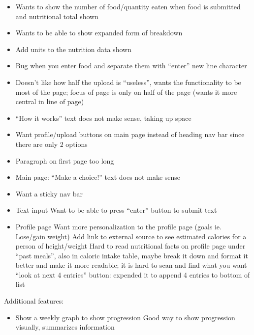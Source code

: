 \documentclass[12pt, titlepage]{article}
\begin{document}
	\begin{itemize}
		\item Wants to show the number of food/quantity eaten when food is submitted and nutritional total
		shown
		\item Wants to be able to show expanded form of breakdown
		\item Add units to the nutrition data shown
		\item Bug when you enter food and separate them with “enter” new line character
		\item Doesn’t like how half the upload is “useless”, wants the functionality to be most of the page;
		focus of page is only on half of the page (wants it more central in line of page)
		\item “How it works” text does not make sense, taking up space
		\item Want profile/upload buttons on main page instead of heading nav bar since there are only 2
		options
		\item Paragraph on first page too long
		\item Main page: “Make a choice!” text does not make sense
		\item Want a sticky nav bar
		\item Text input
		\subitem Want to be able to press “enter” button to submit text
		\item Profile page
		\subitem Want more personalization to the profile page (goals ie. Lose/gain weight)
		\subitem Add link to external source to see estimated calories for a person of height/weight
		\subitem Hard to read nutritional facts on profile page under “past meals”, also in caloric intake
		table, maybe break it down and format it better and make it more readable; it is hard to
		scan and find what you want
		\subitem “look at next 4 entries” button: expended it to append 4 entries to bottom of list
	\end{itemize}
	Additional features:
	\begin{itemize}
		\item Show a weekly graph to show progression 
		\subitem Good way to show progression visually, summarizes information
	\end{itemize}
\end{document}
